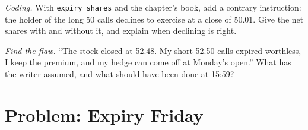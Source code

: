 \begin{exercise}[$\star\star\star$]\label{exo:m1:option-contracts-and-exchanges:7}
\emph{Coding.} With \texttt{expiry\_shares} and the chapter's book, add a
contrary instruction: the holder of the long 50 calls declines to exercise at
a close of 50.01. Give the net shares with and without it, and explain when
declining is right.
\end{exercise}

\begin{exercise}[$\star\star\star$]\label{exo:m1:option-contracts-and-exchanges:8}
\emph{Find the flaw.} ``The stock closed at 52.48. My short 52.50 calls
expired worthless, I keep the premium, and my hedge can come off at Monday's
open.'' What has the writer assumed, and what should have been done at
15:59?
\end{exercise}

\section{Problem: Expiry Friday}

